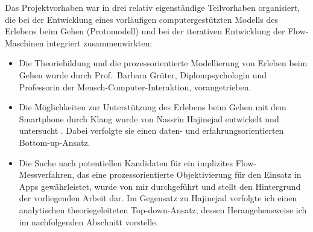 Das Projektvorhaben war in drei relativ eigenständige Teilvorhaben organisiert, die bei der Entwicklung eines vorläufigen computergestützten Modells des Erlebens beim Gehen (Protomodell) und bei der iterativen Entwicklung der Flow-Maschinen integriert zusammenwirkten: 
\begin{itemize}
	
	\item Die Theoriebildung und die prozessorientierte Modellierung von Erleben beim Gehen wurde durch Prof.\ Barbara Grüter, Diplompsychologin und Professorin der Mensch-Computer-Interaktion, vorangetrieben.
	
	\item Die Möglichkeiten zur Unterstützung des Erlebens beim Gehen mit dem Smartphone durch Klang wurde von Nassrin Hajinejad entwickelt und untersucht \citep{Hajinejad2013, Hajinejad2015}. Dabei verfolgte sie einen daten- und erfahrungsorientierten Bottom-up-Ansatz.
	
	\item Die Suche nach potentiellen Kandidaten für ein implizites Flow-Messverfahren, das eine prozessorientierte Objektivierung für den Einsatz in Apps gewährleistet, wurde von mir durchgeführt und stellt den Hintergrund der vorliegenden Arbeit dar. Im Gegensatz zu Hajinejad verfolgte ich einen analytischen theoriegeleiteten Top-down-Ansatz, dessen Herangehensweise ich im nachfolgenden Abschnitt vorstelle. 
\end{itemize}

